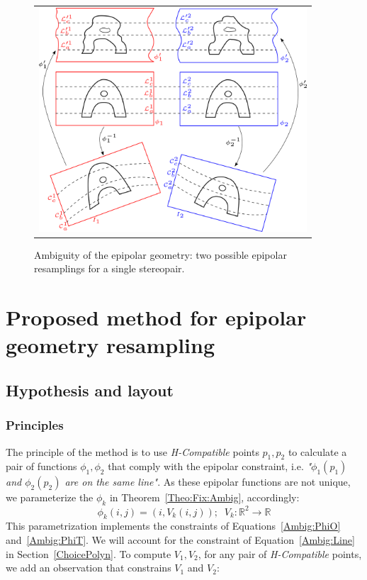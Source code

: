 \documentclass{ipol}
\newcommand{\RR}{\ensuremath{\mathbb{R}}}
\begin{document}
\begin{figure}[h!]
\centering
\begin{tabular}{c}
\includegraphics[width=10cm]{FIGS/AmbigEpip.png}
\end{tabular}
\caption{Ambiguity of the epipolar geometry: two possible epipolar resamplings for a single stereopair.}
\label{FigAmbigEpip}
\end{figure}


\section{Proposed method for epipolar geometry resampling}\label{sec:method}


\subsection{Hypothesis and layout}

\subsubsection{Principles}
The principle of the method is to use \emph{H-Compatible}  points $p_1,p_2$ to calculate a
pair of functions $\phi_1,\phi_2$ that comply with the epipolar constraint, i.e. 
\emph{"$\phi_1(p_1)$ and $\phi_2(p_2)$ are on the same line"}. As these epipolar functions
are not unique, we parameterize the $\phi_k$ in Theorem~\ref{Theo:Fix:Ambig}, accordingly:
%
\begin{equation}
    \phi_k(i,j) = (i,V_k(i,j)); \; \;
    V_k : \RR^2 \rightarrow \RR  
  \label{EpipVParam}
\end{equation}
%
This parametrization implements the constraints of Equations~\eqref{Ambig:PhiO} and~\eqref{Ambig:PhiT}. We will account for the constraint of  Equation~\eqref{Ambig:Line} in Section~\ref{ChoicePolyn}. %
To compute $V_1,V_2$, for any pair of \emph{H-Compatible} points, we add an observation that constrains $V_1$ and $V_2$:
\end{document}
